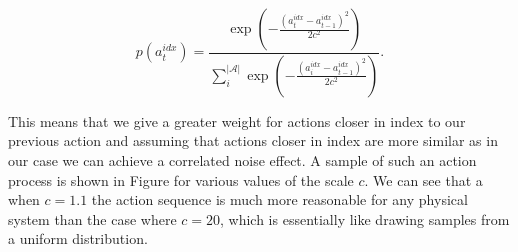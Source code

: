 \documentclass[a4paper,11pt]{report}
\begin{document}
\begin{equation}
	p(a^{idx}_t) =\frac{\exp(-\frac{(a^{idx}_t-a^{idx}_{t-1})^2}{2c^2})}{\sum_i^{|\mathcal{A}|} \exp(-\frac{(a^{idx}_i-a^{idx}_{t-1})^2}{2c^2}) }.
\end{equation}



This means that we give a greater weight for actions closer in index to our previous action and assuming that actions closer in index are more similar as in our case we can achieve a correlated noise effect. A sample of such an action process is shown in Figure for various values of the scale $c$. We can see that a when $c=1.1$ the action sequence is much more reasonable for any physical system than the case where $c=20$, which is essentially like drawing samples from a uniform distribution. 
\end{document}
